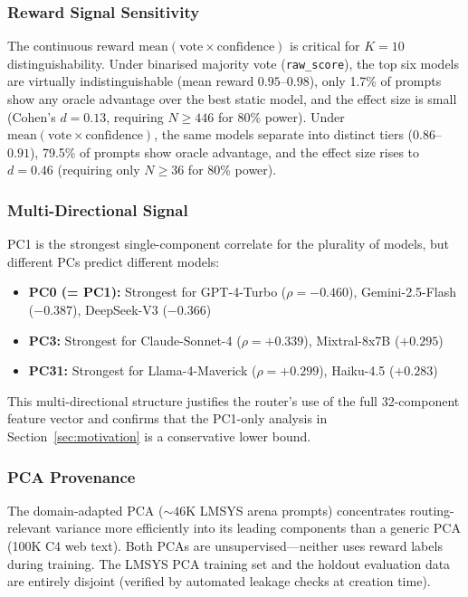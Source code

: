 \subsubsection{Reward Signal Sensitivity}

The continuous reward $\text{mean}(\text{vote} \times \text{confidence})$ is critical for $K{=}10$ distinguishability.
Under binarised majority vote (\texttt{raw\_score}), the top six models are virtually indistinguishable (mean reward $0.95$--$0.98$), only 1.7\% of prompts show any oracle advantage over the best static model, and the effect size is small (Cohen's $d = 0.13$, requiring $N \geq 446$ for 80\% power).
Under $\text{mean}(\text{vote} \times \text{confidence})$, the same models separate into distinct tiers ($0.86$--$0.91$), 79.5\% of prompts show oracle advantage, and the effect size rises to $d = 0.46$ (requiring only $N \geq 36$ for 80\% power).

\subsubsection{Multi-Directional Signal}

PC1 is the strongest single-component correlate for the plurality of models, but different PCs predict different models:
\begin{itemize}[leftmargin=*,noitemsep,topsep=0pt]
    \item \textbf{PC0 (= PC1):} Strongest for GPT-4-Turbo ($\rho = -0.460$), Gemini-2.5-Flash ($-0.387$), DeepSeek-V3 ($-0.366$)
    \item \textbf{PC3:} Strongest for Claude-Sonnet-4 ($\rho = {+}0.339$), Mixtral-8x7B ($+0.295$)
    \item \textbf{PC31:} Strongest for Llama-4-Maverick ($\rho = {+}0.299$), Haiku-4.5 ($+0.283$)
\end{itemize}
This multi-directional structure justifies the router's use of the full 32-component feature vector and confirms that the PC1-only analysis in Section~\ref{sec:motivation} is a conservative lower bound.

\subsubsection{PCA Provenance}

The domain-adapted PCA (${\sim}46$K LMSYS arena prompts) concentrates routing-relevant variance more efficiently into its leading components than a generic PCA (100K C4 web text).
Both PCAs are unsupervised---neither uses reward labels during training.
The LMSYS PCA training set and the holdout evaluation data are entirely disjoint (verified by automated leakage checks at creation time).

